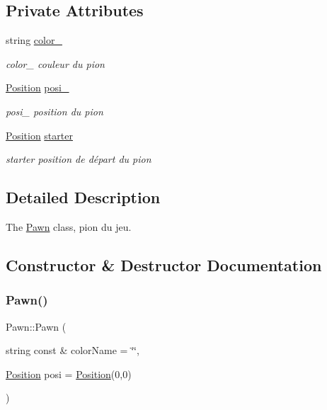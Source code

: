 \subsection*{Private Attributes}
\begin{DoxyCompactItemize}
\item 
\mbox{\label{class_pawn_af327b8a0a1de4353ca4ae0b01137fad5}} 
string \mbox{\hyperlink{class_pawn_af327b8a0a1de4353ca4ae0b01137fad5}{color\+\_\+}}
\begin{DoxyCompactList}\small\item\em color\+\_\+ couleur du pion \end{DoxyCompactList}\item 
\mbox{\label{class_pawn_a89a8a80f619de0e78358a0d3552d4a5b}} 
\mbox{\hyperlink{class_position}{Position}} \mbox{\hyperlink{class_pawn_a89a8a80f619de0e78358a0d3552d4a5b}{posi\+\_\+}}
\begin{DoxyCompactList}\small\item\em posi\+\_\+ position du pion \end{DoxyCompactList}\item 
\mbox{\label{class_pawn_a714b30d332c5f38ec68092323292a417}} 
\mbox{\hyperlink{class_position}{Position}} \mbox{\hyperlink{class_pawn_a714b30d332c5f38ec68092323292a417}{starter}}
\begin{DoxyCompactList}\small\item\em starter position de départ du pion \end{DoxyCompactList}\end{DoxyCompactItemize}


\subsection{Detailed Description}
The \mbox{\hyperlink{class_pawn}{Pawn}} class, pion du jeu. 

\subsection{Constructor \& Destructor Documentation}
\mbox{\label{class_pawn_aed538c943413933d765ce6e7a11e8cf8}} 
\subsubsection{\texorpdfstring{Pawn()}{Pawn()}}
{\footnotesize\ttfamily Pawn\+::\+Pawn (\begin{DoxyParamCaption}\item[{string const \&}]{color\+Name = {\ttfamily \char`\"{}\char`\"{}},  }\item[{\mbox{\hyperlink{class_position}{Position}}}]{posi = {\ttfamily \mbox{\hyperlink{class_position}{Position}}(0,0)} }\end{DoxyParamCaption})\hspace{0.3cm}{\ttfamily [inline]}}



